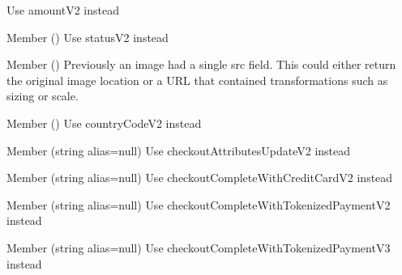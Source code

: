 \begin{DoxyRefList}
%
Use {\ttfamily amount\+V2} instead  
\item[Member \doxylink{class_shopify_1_1_unity_1_1_graph_q_l_1_1_transaction_query_a4569ccdab78b20c9d62d9e5b60ebdfab}{Shopify.Unity.Graph\+QL.Transaction\+Query.status} ()]\label{deprecated__deprecated000126}%
%
Use {\ttfamily status\+V2} instead  
\item[Member \doxylink{class_shopify_1_1_unity_1_1_image_a18260a4ead295cfe3861853746f6133e}{Shopify.Unity.Image.src} ()]\label{deprecated__deprecated000127}%
%
Previously an image had a single {\ttfamily src} field. This could either return the original image location or a URL that contained transformations such as sizing or scale. 
\item[Member \doxylink{class_shopify_1_1_unity_1_1_mailing_address_a5d1d523c65ac6262538d73784d15c086}{Shopify.Unity.Mailing\+Address.country\+Code} ()]\label{deprecated__deprecated000128}%
%
Use {\ttfamily country\+Code\+V2} instead  
\item[Member \doxylink{class_shopify_1_1_unity_1_1_mutation_a80cbbbd6548091ef12630c5257e00d6e}{Shopify.Unity.Mutation.checkout\+Attributes\+Update} (string alias=null)]\label{deprecated__deprecated000129}%
%
Use {\ttfamily checkout\+Attributes\+Update\+V2} instead  
\item[Member \doxylink{class_shopify_1_1_unity_1_1_mutation_adec0f0950d4d680f0fa2c8526a14b364}{Shopify.Unity.Mutation.checkout\+Complete\+With\+Credit\+Card} (string alias=null)]\label{deprecated__deprecated000130}%
%
Use {\ttfamily checkout\+Complete\+With\+Credit\+Card\+V2} instead  
\item[Member \doxylink{class_shopify_1_1_unity_1_1_mutation_af02679e8a8fab6cea1a5b0b733e76375}{Shopify.Unity.Mutation.checkout\+Complete\+With\+Tokenized\+Payment} (string alias=null)]\label{deprecated__deprecated000131}%
%
Use {\ttfamily checkout\+Complete\+With\+Tokenized\+Payment\+V2} instead  
\item[Member \doxylink{class_shopify_1_1_unity_1_1_mutation_a96541ac4375a4d3cc46be34eaf15eff1}{Shopify.Unity.Mutation.checkout\+Complete\+With\+Tokenized\+Payment\+V2} (string alias=null)]\label{deprecated__deprecated000132}%
%
Use {\ttfamily checkout\+Complete\+With\+Tokenized\+Payment\+V3} instead  

\end{DoxyRefList}
